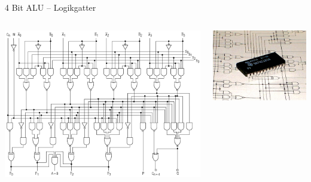 \documentclass[12pt%
,aspectratio=169%
]{beamer}
\begin{document}
\begin{frame}{4 Bit ALU -- Logikgatter}
\begin{columns}[T] %
\begin{column}{.48\textwidth}
\includegraphics[scale=0.25]{pictures/alu2}
\end{column}%
\hfill%
\begin{column}{.48\textwidth}
\centering
\vspace*{1cm}
\includegraphics[scale=0.4]{pictures/alu1}
\end{column}%
\end{columns}
\end{frame}
\end{document}
